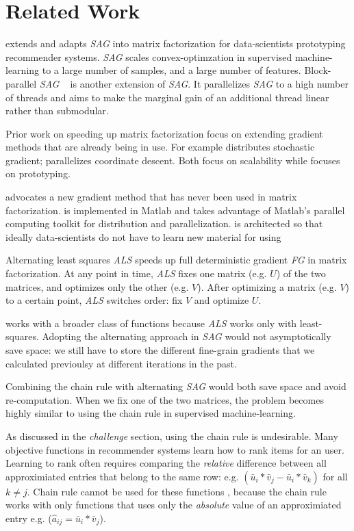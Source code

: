 \section{Related Work}
\tool extends and adapts \emph{SAG} into matrix factorization for data-scientists prototyping recommender systems.
\emph{SAG} \cite{schmidt2013minimizing, roux2012stochastic} scales convex-optimzation in supervised machine-learning to a large number of samples, and a large number of features.
Block-parallel \emph{SAG} ~\cite{bpsag} is another extension of \emph{SAG}.
It parallelizes \emph{SAG} to a high number of threads and aims to make the marginal gain of an additional thread linear rather than submodular.


Prior work on speeding up matrix factorization focus on extending gradient methods that are already being in use.
For example \cite{gemulla2011large} distributes stochastic gradient;
\cite{yu2012scalable} parallelizes coordinate descent.
Both focus on scalability while \tool focuses on prototyping.

\tool advocates a new gradient method that has never been used in matrix factorization.  
\tool is implemented in Matlab and takes advantage of Matlab's parallel computing toolkit for distribution and parallelization.
\tool is architected so that ideally data-scientists do not have to learn new material for using \tool


Alternating least squares \emph{ALS} \cite{koren2009matrix, takacs2012alternating} speeds up full deterministic gradient \emph{FG} in matrix factorization.
At any point in time, \emph{ALS} fixes one matrix (e.g. $U$) of the two matrices, and optimizes only the other (e.g. $V$).
After optimizing a matrix (e.g. $V$) to a certain point, \emph{ALS} switches order: fix $V$ and optimize $U$.

\tool works with a broader class of functions because \emph{ALS} works only with least-squares.
Adopting the alternating approach in \emph{SAG} would not asymptotically save space:
we still have to store the different fine-grain gradients that we calculated previoulsy at different iterations in the past.

Combining the chain rule with alternating \emph{SAG} would both save space and avoid re-computation.
When we fix one of the two matrices, the problem becomes highly similar to using the chain rule in supervised machine-learning.  

As discussed in the \emph{challenge} section, using the chain rule is undesirable.
Many objective functions in recommender systems learn how to rank items for an user.
Learning to rank often requires comparing the \emph{relative} difference between all approximiated entries that belong to the same row:
e.g. $\left(\bar{u}_{i}*\bar{v}_{j} - \bar{u}_{i}*\bar{v}_{k}\right)$ for all $k \neq j$.
Chain rule cannot be used for these functions \cite{gapfm, climf, bpr, mnar, mmmf}, because 
the chain rule works with only functions that uses only the \emph{absolute} value of an approximiated entry e.g. ($\hat{a}_{ij} = \bar{u}_{i}*\bar{v}_{j}$).
